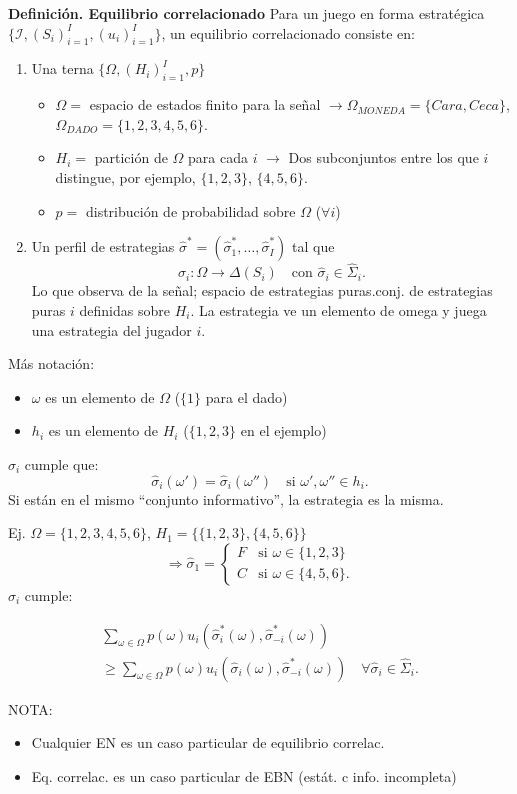 \documentclass[11pt,a4paper]{article}
\newenvironment{apuntebox}[1]{\begin{tcolorbox}[colback=palered,colframe=inkred,boxrule=.7pt,arc=0mm,left=.8em,right=.8em,top=.45em,bottom=.45em]\textcolor{inkred}{\textbf{#1}}\quad}{\end{tcolorbox}}
\newcommand{\rojo}[1]{\textcolor{inkred}{#1}}
\newcommand{\gris}[1]{\textcolor{pencilgray}{#1}}
\begin{document}
\begin{apuntebox}{Definición. Equilibrio correlacionado}
Para un juego en forma estratégica $\{\mathcal I,(S_i)_{i=1}^I,(u_i)_{i=1}^I\}$, un \rojo{equilibrio correlacionado} consiste en:
\begin{enumerate}\item Una terna $\{\Omega,(H_i)_{i=1}^I,p\}$
\begin{itemize}\item $\Omega=$ espacio de estados finito para la señal
\gris{$\to\Omega_{MONEDA}=\{Cara,Ceca\}$, $\Omega_{DADO}=\{1,2,3,4,5,6\}$.}
\item $H_i=$ partición de $\Omega$ para cada $i$
\gris{$\to$ Dos subconjuntos entre los que $i$ distingue, por ejemplo, $\{1,2,3\}$, $\{4,5,6\}$.}
\item $p=$ distribución de probabilidad sobre $\Omega$ ($\forall i$)\end{itemize}
\item Un perfil de estrategias $\widehat\sigma^*=(\widehat\sigma_1^*,\ldots,\widehat\sigma_I^*)$ tal que
\[\widehat\sigma_i:\Omega\to\Delta(S_i)\quad\text{con }\widehat\sigma_i\in\widehat\Sigma_i.\]
\gris{Lo que observa de la señal; espacio de estrategias puras.}\quad\rojo{conj. de estrategias puras $i$ definidas sobre $H_i$.}
\gris{La estrategia ve un elemento de omega y juega una estrategia del jugador $i$.}\end{enumerate}
\end{apuntebox}


Más notación:
\begin{itemize}\item $\omega$ es un elemento de $\Omega$ \gris{($\{1\}$ para el dado)}
\item $h_i$ es un elemento de $H_i$ \gris{($\{1,2,3\}$ en el ejemplo)}\end{itemize}
$\widehat\sigma_i$ cumple que:
\[\widehat\sigma_i(\omega')=\widehat\sigma_i(\omega'')\quad\text{si }\omega',\omega''\in h_i.\]
\gris{Si están en el mismo ``conjunto informativo'', la estrategia es la misma.}

\gris{Ej. $\Omega=\{1,2,3,4,5,6\}$, $H_1=\{\{1,2,3\},\{4,5,6\}\}$
\[\Rightarrow\widehat\sigma_1=\begin{cases}F&\text{si }\omega\in\{1,2,3\}\\C&\text{si }\omega\in\{4,5,6\}.\end{cases}\]}
$\widehat\sigma_i$ cumple:
\begin{apuntebox}{}\begin{multline*}\sum_{\omega\in\Omega}p(\omega)u_i(\widehat\sigma_i^*(\omega),\widehat\sigma_{-i}^*(\omega))\\\ge\sum_{\omega\in\Omega}p(\omega)u_i(\widehat\sigma_i(\omega),\widehat\sigma_{-i}^*(\omega))\quad\forall\widehat\sigma_i\in\widehat\Sigma_i.\end{multline*}\end{apuntebox}
NOTA:
\begin{itemize}\item Cualquier EN es un caso particular de equilibrio correlac.
\item Eq. correlac. es un caso particular de EBN \gris{(estát. c info. incompleta)}\end{itemize}
\end{document}

